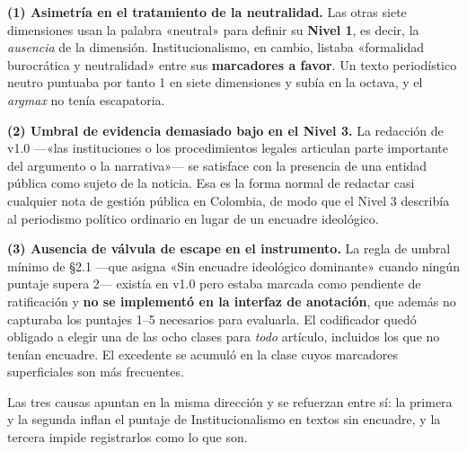 \documentclass[11pt,letterpaper]{article}
\begin{document}
\textbf{(1) Asimetría en el tratamiento de la neutralidad.} Las otras siete dimensiones usan la palabra
«neutral» para definir su \textbf{Nivel 1}, es decir, la \emph{ausencia} de la dimensión. Institucionalismo, en
cambio, listaba «formalidad burocrática y neutralidad» entre sus \textbf{marcadores a favor}. Un texto
periodístico neutro puntuaba por tanto 1 en siete dimensiones y subía en la octava, y el \emph{argmax} no
tenía escapatoria.

\textbf{(2) Umbral de evidencia demasiado bajo en el Nivel 3.} La redacción de v1.0 —«las instituciones o los
procedimientos legales articulan parte importante del argumento o la narrativa»— se satisface con la
presencia de una entidad pública como sujeto de la noticia. Esa es la forma normal de redactar casi cualquier
nota de gestión pública en Colombia, de modo que el Nivel 3 describía al periodismo político ordinario en
lugar de un encuadre ideológico.

\textbf{(3) Ausencia de válvula de escape en el instrumento.} La regla de umbral mínimo de §2.1 —que
asigna «Sin encuadre ideológico dominante» cuando ningún puntaje supera 2— existía en v1.0 pero estaba
marcada como pendiente de ratificación y \textbf{no se implementó en la interfaz de anotación}, que además
no capturaba los puntajes 1–5 necesarios para evaluarla. El codificador quedó obligado a elegir una de las
ocho clases para \emph{todo} artículo, incluidos los que no tenían encuadre. El excedente se acumuló en la
clase cuyos marcadores superficiales son más frecuentes.

Las tres causas apuntan en la misma dirección y se refuerzan entre sí: la primera y la segunda inflan el
puntaje de Institucionalismo en textos sin encuadre, y la tercera impide registrarlos como lo que son.
\end{document}

